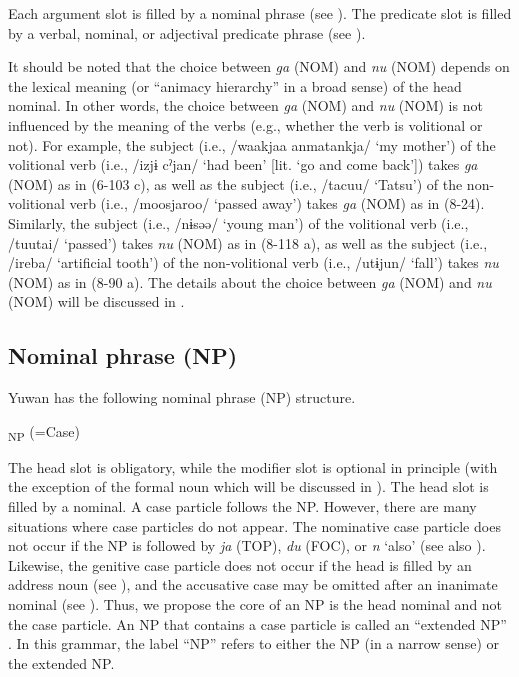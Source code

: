 Each argument slot is filled by a nominal phrase (see ). The predicate slot is filled by a verbal, nominal, or adjectival predicate phrase (see ).

It should be noted that the choice between \textit{ga} (NOM) and \textit{nu} (NOM) depends on the lexical meaning (or “animacy hierarchy” in a broad sense) of the head nominal. In other words, the choice between \textit{ga} (NOM) and \textit{nu} (NOM) is not influenced by the meaning of the verbs (e.g., whether the verb is volitional or not). For example, the subject (i.e., /waakjaa anmatankja/ ‘my mother’) of the volitional verb (i.e., /izjɨ cˀjan/ ‘had been’ [lit. ‘go and come back’]) takes \textit{ga} (NOM) as in (6-103 c), as well as the subject (i.e., /tacuu/ ‘Tatsu’) of the non-volitional verb (i.e., /moosjaroo/ ‘passed away’) takes \textit{ga} (NOM) as in (8-24). Similarly, the subject (i.e., /nɨsəə/ ‘young man’) of the volitional verb (i.e., /tuutai/ ‘passed’) takes \textit{nu} (NOM) as in (8-118 a), as well as the subject (i.e., /ireba/ ‘artificial tooth’) of the non-volitional verb (i.e., /utɨjun/ ‘fall’) takes \textit{nu} (NOM) as in (8-90 a). The details about the choice between \textit{ga} (NOM) and \textit{nu} (NOM) will be discussed in .

\subsection{Nominal phrase (NP)}\label{sec:4.1.2}

Yuwan has the following nominal phrase (NP) structure.

\ea{}\textsubscript{NP}\textit{\textsubscript{} }(=Case)
\z

The head slot is obligatory, while the modifier slot is optional in principle (with the exception of the formal noun which will be discussed in ). The head slot is filled by a nominal. A case particle follows the NP. However, there are many situations where case particles do not appear. The nominative case particle does not occur if the NP is followed by \textit{ja} (TOP), \textit{du} (FOC), or \textit{n} ‘also’ (see also ). Likewise, the genitive case particle does not occur if the head is filled by an address noun (see ), and the accusative case may be omitted after an inanimate nominal (see ). Thus, we propose the core of an NP is the head nominal and not the case particle. An NP that contains a case particle is called an “extended NP” \citep[167]{Shimoji2008}. In this grammar, the label “NP” refers to either the NP (in a narrow sense) or the extended NP.

